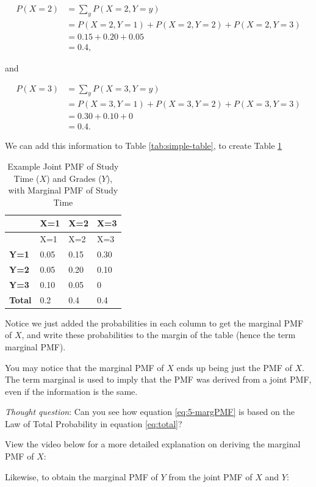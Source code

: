 \documentclass[
]{book}
\begin{document}
\[
\begin{split}
P(X=2) &= \sum_y P(X=2, Y=y)\\
 &= P(X=2, Y=1) + P(X=2, Y=2) + P(X=2, Y=3) \\
&= 0.15 + 0.20 + 0.05\\
&= 0.4,
\end{split}
\]

and

\[
\begin{split}
P(X=3) &= \sum_y P(X=3, Y=y)\\
 &= P(X=3, Y=1) + P(X=3, Y=2) + P(X=3, Y=3) \\
&= 0.30 + 0.10 + 0\\
&= 0.4.
\end{split}
\]

We can add this information to Table \ref{tab:simple-table}, to create Table \ref{tab:5-marg-table}

\begin{longtable}[]{@{}llll@{}}
\caption{\label{tab:5-marg-table} Example Joint PMF of Study Time (\(X\)) and Grades (\(Y\)), with Marginal PMF of Study Time}\tabularnewline
\toprule\noalign{}
& X=1 & X=2 & X=3 \\
\midrule\noalign{}
\endfirsthead
\toprule\noalign{}
& X=1 & X=2 & X=3 \\
\midrule\noalign{}
\endhead
\bottomrule\noalign{}
\endlastfoot
\textbf{Y=1} & 0.05 & 0.15 & 0.30 \\
\textbf{Y=2} & 0.05 & 0.20 & 0.10 \\
\textbf{Y=3} & 0.10 & 0.05 & 0 \\
\textbf{Total} & 0.2 & 0.4 & 0.4 \\
\end{longtable}

Notice we just added the probabilities in each column to get the marginal PMF of \(X\), and write these probabilities to the margin of the table (hence the term marginal PMF).

You may notice that the marginal PMF of \(X\) ends up being just the PMF of \(X\). The term marginal is used to imply that the PMF was derived from a joint PMF, even if the information is the same.

\emph{Thought question}: Can you see how equation \eqref{eq:5-margPMF} is based on the Law of Total Probability in equation \eqref{eq:total}?

View the video below for a more detailed explanation on deriving the marginal PMF of \(X\):

Likewise, to obtain the marginal PMF of \(Y\) from the joint PMF of \(X\) and \(Y\):
\end{document}
